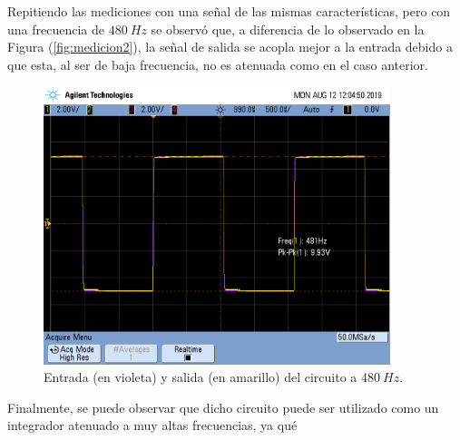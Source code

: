 \documentclass[a4paper]{article}
\begin{document}
Repitiendo las mediciones con una señal de las mismas características, pero con una frecuencia de $ 480 \ Hz $ se observó que, a diferencia de lo observado en la Figura (\ref{fig:medicion2}), la señal de salida se acopla mejor a la entrada debido a que esta, al ser de baja frecuencia, no es atenuada como en el caso anterior.

\begin{figure}[H]
	\centering
	\includegraphics[width=0.9\textwidth , trim={0.7cm 6.25cm  0 3.5cm},clip]{scope_3}
\caption{Entrada (en violeta) y salida (en amarillo) del circuito a $ 480 \ Hz $.}
	\label{fig:medicion2bajasf}
\end{figure}

Finalmente, se puede observar que dicho circuito puede ser utilizado como un integrador atenuado a muy altas frecuencias, ya qué
\end{document}
